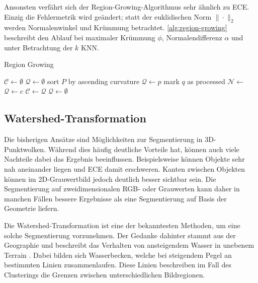 Ansonsten verfährt sich der Region-Growing-Algorithmus sehr ähnlich zu \ac{ECE}.
Einzig die Fehlermetrik wird geändert; statt der euklidischen Norm $\|\cdot\|_2$ werden Normalenwinkel und Krümmung betrachtet.
\autoref{alg:region-growing} beschreibt den Ablauf bei maximaler Krümmung $\phi$, Normalendifferenz $\alpha$ und unter Betrachtung der $k$ \ac{KNN}.

\begin{algorithm}
\caption{Region Growing}
\label{alg:region-growing}
\begin{algorithmic}
\State $\mathcal{C} \gets \emptyset$
\State $\mathcal{Q} \gets \emptyset$
\State sort $P$ by ascending curvature
	\State $\mathcal{Q} \gets p$
		\State mark $q$ as processed
		\State $\mathcal{N} \gets$ 
				\State $\mathcal{Q} \gets c$
			\EndIf
		\EndFor
	\EndFor
	\State $\mathcal{C} \gets \mathcal{Q}$
	\State $\mathcal{Q} \gets \emptyset$
\EndFor
\State {}
\end{algorithmic}
\end{algorithm}


\subsection{Watershed-Transformation}
\label{subsec:watershed}

Die bisherigen Ansätze sind Möglichkeiten zur Segmentierung in 3D-Punktwolken.
Während dies häufig deutliche Vorteile hat, können auch viele Nachteile dabei das Ergebnis beeinflussen.
Beispielsweise können Objekte sehr nah aneinander liegen und \ac{ECE} damit erschweren.
Kanten zwischen Objekten können im 2D-Grauwertbild jedoch deutlich besser sichtbar sein.
Die Segmentierung auf zweidimensionalen RGB- oder Grauwerten kann daher in manchen Fällen bessere Ergebnisse als eine Segmentierung auf Basis der Geometrie liefern.

Die Watershed-Transformation ist eine der bekanntesten Methoden, um eine solche Segmentierung vorzunehmen.
Der Gedanke dahinter stammt aus der Geographie und beschreibt das Verhalten von ansteigendem Wasser in unebenem Terrain \cite[1--2]{roerdink2000watershed}.
Dabei bilden sich Wasserbecken, welche bei steigendem Pegel an bestimmten Linien zusammenlaufen.
Diese Linien beschreiben im Fall des Clusterings die Grenzen zwischen unterschiedlichen Bildregionen.

